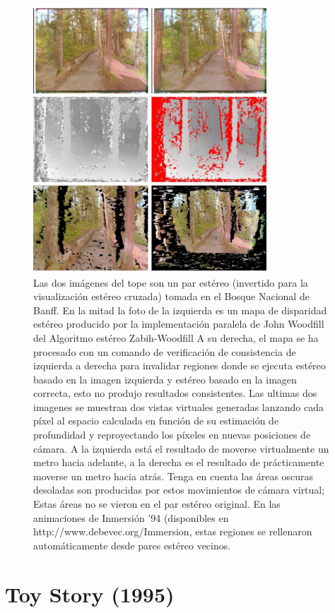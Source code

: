 \documentclass[a4paper,12pt]{report}
\begin{document}
\begin{figure}[!ht]
    \centering
    \includegraphics[height=10cm]{Imagenes/immersion_img}
    \caption{Las dos imágenes del tope son
    un par estéreo (invertido para la visualización estéreo cruzada) tomada en el Bosque Nacional de Banff. 
    En la mitad la foto de la izquierda es un mapa de disparidad estéreo producido por la implementación paralela de John Woodfill del
    Algoritmo estéreo Zabih-Woodfill \cite{Zabih_Woodfill} A su derecha, el mapa se ha procesado 
    con un comando de verificación de consistencia de izquierda a derecha para invalidar regiones 
    donde se ejecuta estéreo basado en la imagen izquierda y estéreo
    basado en la imagen correcta, esto no produjo resultados consistentes.
    Las ultimas dos imagenes se muestran dos vistas virtuales generadas
    lanzando cada píxel al espacio calculada en función de su estimación de profundidad y reproyectando los
    píxeles en nuevas posiciones de cámara. A la izquierda está el resultado de moverse virtualmente 
    un metro hacia adelante, a la derecha es el resultado de prácticamente moverse un metro hacia atrás. 
    Tenga en cuenta las áreas oscuras desoladas son producidas por estos movimientos de cámara virtual; 
    Estas áreas no se vieron en el par estéreo original. En
    las animaciones de Inmersión '94 (disponibles en http://www.debevec.org/Immersion, estas regiones
    se rellenaron automáticamente desde pares estéreo vecinos.}
    \label{fig:immersion_img}
\end{figure}
 
 
\newpage
 
 
\section{Toy Story (1995)}
 
\end{document}
